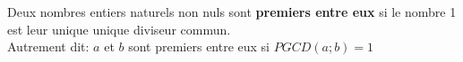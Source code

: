 
Deux nombres entiers naturels non nuls sont \textbf{premiers entre eux} si le nombre 1 est leur unique unique diviseur commun. \\
Autrement dit: $a$ et $b$ sont premiers entre eux si $PGCD(a;b)=1$
